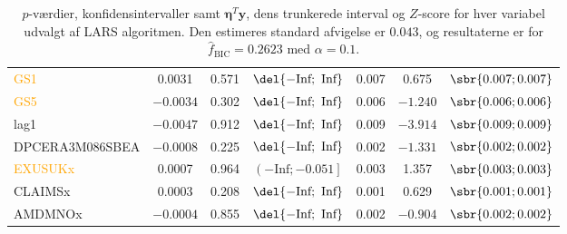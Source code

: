 \begin{table}[ht]
{\begin{tabular}{lcccccc}
 \textcolor{orange}{GS1}  &0.0031& 0.571 &      $\del{-\text{Inf}   ;  \text{ Inf} }$ &  0.007&   0.675&   $\sbr{0.007 ;  0.007}$     \\
 \textcolor{orange}{GS5}&$-0.0034$& 0.302&      $\del{-\text{Inf}   ;  \text{ Inf} }$&   0.006 &$ -1.240$ &   $\sbr{0.006;  0.006}$   \\
 \textcolor{blue3}{lag1} &$-0.0047$&  0.912   &  $\del{-\text{Inf}   ;  \text{ Inf} }$& 0.009& $ -3.914  $& $\sbr{0.009;   0.009 }$   \\
  \textcolor{red3}{DPCERA3M086SBEA}  &$-0.0008$& 0.225 &      $\del{-\text{Inf}   ;  \text{ Inf} }$ & 0.002&  $-1.331  $& $\sbr{0.002;   0.002 }$   \\
 \textcolor{orange}{EXUSUKx} &0.0007 & 0.964  &    $\left( -\text{Inf}   ;  -0.051\right] $& 0.003 &  1.357  &  $\sbr{0.003 ;  0.003}$   \\
 \textcolor{blue3}{CLAIMSx} &0.0003& 0.208   &   $\del{-\text{Inf}   ;  \text{ Inf} }$&  0.001  & 0.629  & $\sbr{ 0.001 ;  0.001 }$  \\
 \textcolor{red3}{AMDMNOx} &$-0.0004$ & 0.855     &  $\del{-\text{Inf}   ;  \text{ Inf} }$&  0.002&  $-0.904 $ &$\sbr{0.002 ;  0.002}$  \\ \bottomrule
\end{tabular}  
}
\caption{\(p\)-værdier, konfidensintervaller samt  $\boldsymbol{\eta}^T\textbf{y}$, dens trunkerede interval og $Z$-score for hver variabel udvalgt af LARS algoritmen. Den estimeres standard afvigelse er \(0.043\), og resultaterne er for \(\widehat{f}_{\text{BIC}} = 0.2623 \) med \(\alpha = 0.1\).} \label{tab:larInf_bic}
\end{table} 